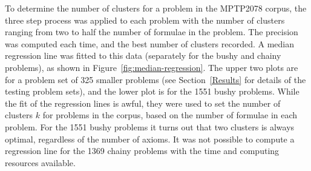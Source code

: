 \documentclass[]{ceurart}
\begin{document}
To determine the number of clusters for a problem in the MPTP2078 corpus,
the three step process was applied to each problem with the number of 
clusters ranging from two to half the number of formulae in the problem.
The precision was computed each time, and the best number of clusters
recorded.
A median regression line was fitted to this data (separately for the
bushy and chainy problems), as shown in Figure~\ref{fig:median-regression}.
The upper two plots are for a problem set of 325 smaller problems (see
Section~\ref{Results} for details of the testing problem sets), and the
lower plot is for the 1551 bushy problems.
While the fit of the regression lines is awful, they were used to set the 
number of clusters $k$ for problems in the corpus, based on the number of 
formulae in each problem.
For the 1551 bushy problems it turns out that two clusters is always optimal,
regardless of the number of axioms.
It was not possible to compute a regression line for the 1369 chainy
problems with the time and computing resources available.
\end{document}
